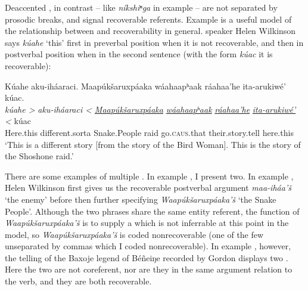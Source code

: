 \documentclass[output=paper]{LSP/langsci}
\begin{document}
Deaccented , in contrast -- like \emph{níkshiⁿga} in example  -- are not separated by prosodic breaks, and signal recoverable referents. Example  is a useful model of the relationship between  and recoverability in general.  speaker Helen Wilkinson says \emph{kúahe} `this' first in preverbal position when it is not recoverable, and then in postverbal position when in the second sentence (with the form \emph{kúac} it is recoverable):

\ea\label{wilkinsonpostverbal}
Kúahe aku-iháaraci. Maapúkšaruxpáaka wáahaapʰaak ráahaa’he ita-arukiwé’ kúac.\footnotemark\\
\gll	\emph{kúahe >}	\emph{aku-iháaraci <}	\emph{\underline{Maapúkšaruxpáaka}} 	\emph{\underline{wáahaapʰaak}} 	\emph{\underline{ráahaa’he}}			\emph{\underline{ita-arukiwé’} <}		kúac\\
	Here.this 		different.sorta		Snake.People 					raid 						go.\textsc{caus}.that 				their.story.tell 					here.this\\
\glt	`This is a different story [from the story of the Bird Woman]. This is the story of the Shoshone raid.'
\z

There are some examples of multiple . In example , I present two. In example , Helen Wilkinson first gives us the recoverable postverbal argument \emph{maa-iháa’š} `the enemy' before then further specifying \emph{Waapúkšaruxpáaka’š} `the Snake People'. Although the two phrases share the same entity referent, the function of \emph{Waapúkšaruxpáaka’š} is to supply a  which is not inferrable at this point in the  model, so \emph{Waapúkšaruxpáaka’š} is coded nonrecoverable (one of the few unseparated by commas which I coded nonrecoverable). In example , however, the telling of the Baxoje legend of Béñeiŋe recorded by Gordon \citet{Marsh1936} displays two . Here the two are not coreferent, nor are they in the same argument relation to the verb, and they are both recoverable. 
\end{document}
